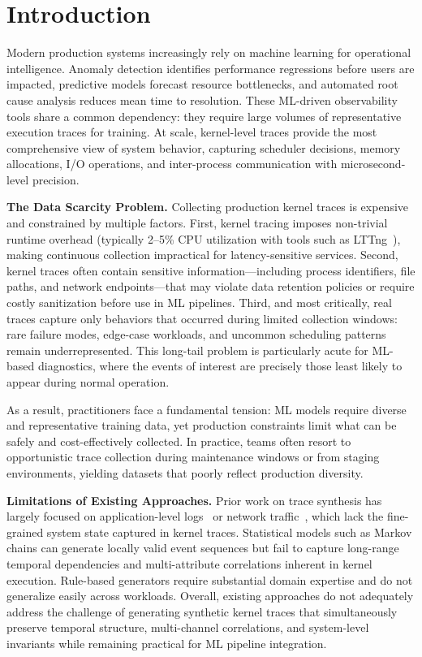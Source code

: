 \section{Introduction}
\label{sec:intro}

Modern production systems increasingly rely on machine learning for operational intelligence. Anomaly detection identifies performance regressions before users are impacted, predictive models forecast resource bottlenecks, and automated root cause analysis reduces mean time to resolution.
These ML-driven observability tools share a common dependency: they require large volumes of representative execution traces for training.
At scale, kernel-level traces provide the most comprehensive view of system behavior, capturing scheduler decisions, memory allocations, I/O operations, and inter-process communication with microsecond-level precision.

\noindent\textbf{The Data Scarcity Problem.}
Collecting production kernel traces is expensive and constrained by multiple factors.
First, kernel tracing imposes non-trivial runtime overhead (typically 2--5\% CPU utilization with tools such as LTTng~\cite{Desnoyers2006The}), making continuous collection impractical for latency-sensitive services.
Second, kernel traces often contain sensitive information---including process identifiers, file paths, and network endpoints---that may violate data retention policies or require costly sanitization before use in ML pipelines.
Third, and most critically, real traces capture only behaviors that occurred during limited collection windows: rare failure modes, edge-case workloads, and uncommon scheduling patterns remain underrepresented.
This long-tail problem is particularly acute for ML-based diagnostics, where the events of interest are precisely those least likely to appear during normal operation.

As a result, practitioners face a fundamental tension: ML models require diverse and representative training data, yet production constraints limit what can be safely and cost-effectively collected.
In practice, teams often resort to opportunistic trace collection during maintenance windows or from staging environments, yielding datasets that poorly reflect production diversity.

\noindent\textbf{Limitations of Existing Approaches.}
Prior work on trace synthesis has largely focused on application-level logs~\cite{logsynth} or network traffic~\cite{netgan}, which lack the fine-grained system state captured in kernel traces.
Statistical models such as Markov chains can generate locally valid event sequences but fail to capture long-range temporal dependencies and multi-attribute correlations inherent in kernel execution.
Rule-based generators require substantial domain expertise and do not generalize easily across workloads.
Overall, existing approaches do not adequately address the challenge of generating synthetic kernel traces that simultaneously preserve temporal structure, multi-channel correlations, and system-level invariants while remaining practical for ML pipeline integration.


